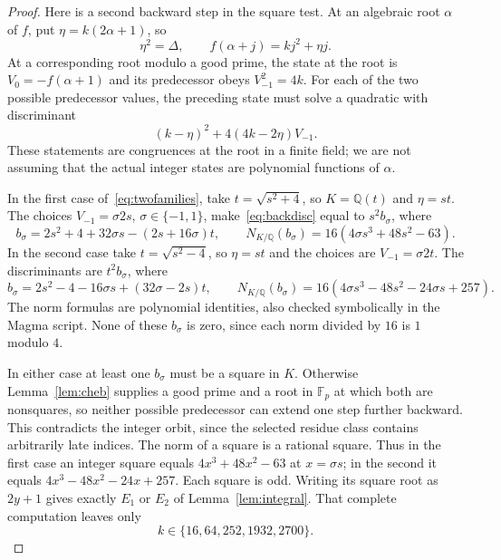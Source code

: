 \documentclass[11pt]{article}
\newcommand{\Q}{\mathbb Q}
\newcommand{\Fp}{\mathbb F_p}
\begin{document}
\begin{proof}
Here is a second backward step in the square test. At an algebraic root
$\alpha$ of $f$, put $\eta=k(2\alpha+1)$, so
\[
 \eta^2=\Delta,\qquad f(\alpha+j)=kj^2+\eta j.
\]
At a corresponding root modulo a good prime, the state at the root is
$V_0=-f(\alpha+1)$ and its predecessor obeys $V_{-1}^2=4k$.
For each of the two possible predecessor values, the preceding state
must solve a quadratic with discriminant
\begin{equation}\label{eq:backdisc}
 (k-\eta)^2+4(4k-2\eta)V_{-1}.
\end{equation}
These statements are congruences at the root in a finite field; we are
not assuming that the actual integer states are polynomial functions
of $\alpha$.

In the first case of~\eqref{eq:twofamilies}, take $t=\sqrt{s^2+4}$,
so $K=\Q(t)$ and $\eta=st$. The choices $V_{-1}=\sigma 2s$,
$\sigma\in\{-1,1\}$, make~\eqref{eq:backdisc} equal to $s^2b_\sigma$,
where
\[
 b_\sigma=2s^2+4+32\sigma s-(2s+16\sigma)t,
 \qquad
 N_{K/\Q}(b_\sigma)=16(4\sigma s^3+48s^2-63).
\]
In the second case take $t=\sqrt{s^2-4}$, so $\eta=st$ and the
choices are $V_{-1}=\sigma2t$. The discriminants are $t^2b_\sigma$,
where
\[
 b_\sigma=2s^2-4-16\sigma s+(32\sigma-2s)t,
 \qquad
 N_{K/\Q}(b_\sigma)=16(4\sigma s^3-48s^2-24\sigma s+257).
\]
The norm formulas are polynomial identities, also checked symbolically
in the Magma script. None of these $b_\sigma$ is zero, since each norm
divided by $16$ is $1$ modulo $4$.

In either case at least one $b_\sigma$ must be a square in $K$.
Otherwise Lemma~\ref{lem:cheb} supplies a good prime and a root in
$\Fp$ at which both are nonsquares, so neither possible predecessor
can extend one step further backward. This contradicts the integer
orbit, since the selected residue class contains arbitrarily late
indices. The norm of a square is a rational square. Thus in the first
case an integer square equals
$4x^3+48x^2-63$ at $x=\sigma s$; in the second it equals
$4x^3-48x^2-24x+257$. Each square is odd. Writing its square root as
$2y+1$ gives exactly $E_1$ or $E_2$ of Lemma~\ref{lem:integral}.
That complete computation leaves only
\begin{equation}\label{eq:five}
 k\in\{16,64,252,1932,2700\}.
\end{equation}


\end{proof}
\end{document}
